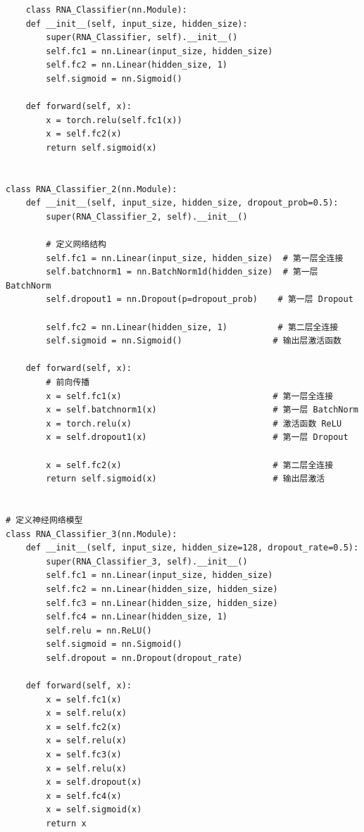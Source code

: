 \documentclass[a4paper,11pt,AutoFakeBold]{ctexart}
\begin{document}
\begin{lstlisting}
    class RNA_Classifier(nn.Module):
    def __init__(self, input_size, hidden_size):
        super(RNA_Classifier, self).__init__()
        self.fc1 = nn.Linear(input_size, hidden_size)
        self.fc2 = nn.Linear(hidden_size, 1)
        self.sigmoid = nn.Sigmoid()

    def forward(self, x):
        x = torch.relu(self.fc1(x))
        x = self.fc2(x)
        return self.sigmoid(x)


class RNA_Classifier_2(nn.Module):
    def __init__(self, input_size, hidden_size, dropout_prob=0.5):
        super(RNA_Classifier_2, self).__init__()
        
        # 定义网络结构
        self.fc1 = nn.Linear(input_size, hidden_size)  # 第一层全连接
        self.batchnorm1 = nn.BatchNorm1d(hidden_size)  # 第一层 BatchNorm
        self.dropout1 = nn.Dropout(p=dropout_prob)    # 第一层 Dropout
        
        self.fc2 = nn.Linear(hidden_size, 1)          # 第二层全连接
        self.sigmoid = nn.Sigmoid()                  # 输出层激活函数

    def forward(self, x):
        # 前向传播
        x = self.fc1(x)                              # 第一层全连接
        x = self.batchnorm1(x)                       # 第一层 BatchNorm
        x = torch.relu(x)                            # 激活函数 ReLU
        x = self.dropout1(x)                         # 第一层 Dropout
        
        x = self.fc2(x)                              # 第二层全连接
        return self.sigmoid(x)                       # 输出层激活


# 定义神经网络模型
class RNA_Classifier_3(nn.Module):
    def __init__(self, input_size, hidden_size=128, dropout_rate=0.5):
        super(RNA_Classifier_3, self).__init__()
        self.fc1 = nn.Linear(input_size, hidden_size)
        self.fc2 = nn.Linear(hidden_size, hidden_size)
        self.fc3 = nn.Linear(hidden_size, hidden_size)
        self.fc4 = nn.Linear(hidden_size, 1)
        self.relu = nn.ReLU()
        self.sigmoid = nn.Sigmoid()
        self.dropout = nn.Dropout(dropout_rate)
        
    def forward(self, x):
        x = self.fc1(x)
        x = self.relu(x)
        x = self.fc2(x)
        x = self.relu(x)
        x = self.fc3(x)
        x = self.relu(x)
        x = self.dropout(x)
        x = self.fc4(x)
        x = self.sigmoid(x)
        return x
\end{lstlisting}
\end{document}
